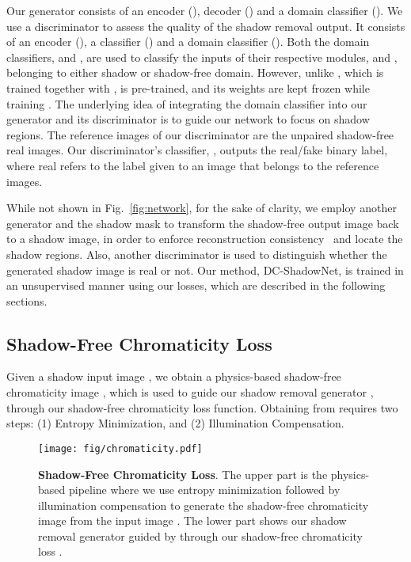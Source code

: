 \documentclass[10pt,twocolumn,letterpaper]{article}
\begin{document}
Our generator  consists of an encoder (), decoder () and a domain classifier (). 
We use a discriminator  to assess the quality of the shadow removal output. It consists of an encoder (), a classifier () and a domain classifier ().
Both the domain classifiers,  and , are used to classify the inputs of their respective modules,  and , belonging to either shadow or shadow-free domain. However, unlike , which is trained together with ,  is pre-trained, and its weights are kept frozen while training . 
The underlying idea of integrating the domain classifier into our generator and its discriminator is to guide our network to focus on shadow regions.
The reference images of our discriminator are the unpaired shadow-free real images. Our discriminator's classifier, , outputs the real/fake binary label, where real refers to the label given to an image that belongs to the reference images. 

While not shown in Fig.~\ref{fig:network}, for the sake of clarity, we employ another generator  and the shadow mask to transform the shadow-free output image back to a shadow image, in order to enforce reconstruction consistency~\cite{Zhu17} and locate the shadow regions.
Also, another discriminator  is used to distinguish whether the generated shadow image is real or not.
Our method, DC-ShadowNet, is trained in an unsupervised manner using our losses, which are described in the following sections.


\subsection{Shadow-Free Chromaticity Loss}
Given a shadow input image , we obtain a physics-based shadow-free chromaticity image , which is used to guide our shadow removal generator , through our shadow-free chromaticity loss function. 
Obtaining  from  requires two steps: (1) Entropy Minimization, and (2) Illumination Compensation. 

\begin{figure}[t]
	\begin{center}
		\captionsetup[subfigure]{labelformat=empty}
		{\texttt{[image: fig/chromaticity.pdf]}}
		\vspace{-0.125in}	
	\end{center}
	\vspace{-0.2in}
	\caption{\textbf{Shadow-Free Chromaticity Loss}. The upper part is the physics-based pipeline where we use entropy minimization followed by illumination compensation to generate the shadow-free chromaticity image  from the input image .
The lower part shows our shadow removal generator  guided by  through our shadow-free chromaticity loss .}
	\label{fig:chromaticityloss}
	\vspace{0.05in}
\end{figure}
\end{document}
